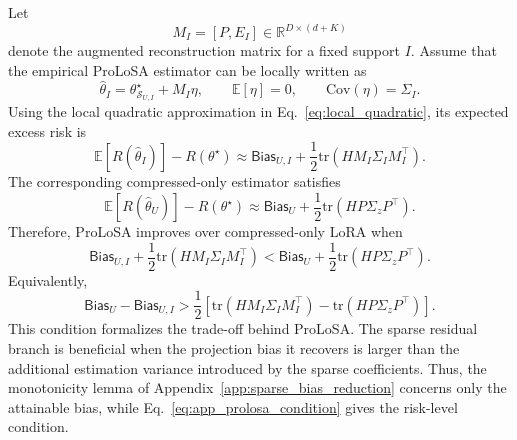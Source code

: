 Let
\begin{equation}
M_I=[P,E_I]\in\mathbb{R}^{D\times(d+K)}
\label{eq:app_augmented_reconstruction_matrix}
\end{equation}
denote the augmented reconstruction matrix for a fixed support $I$.
Assume that the empirical ProLoSA estimator can be locally written as
\begin{equation}
\hat{\theta}_I
=
\theta^\star_{\mathcal{S}_{U,I}}
+
M_I\eta,
\qquad
\mathbb{E}[\eta]=0,
\qquad
\mathrm{Cov}(\eta)=\Sigma_I .
\label{eq:app_prolosa_estimator_decomposition}
\end{equation}
Using the local quadratic approximation in Eq.~\eqref{eq:local_quadratic}, its expected excess risk is
\begin{equation}
\mathbb{E}[R(\hat{\theta}_I)]-R(\theta^\star)
\approx
\mathsf{Bias}_{U,I}
+
\frac{1}{2}
\mathrm{tr}(HM_I\Sigma_IM_I^\top).
\label{eq:app_prolosa_excess_risk}
\end{equation}
The corresponding compressed-only estimator satisfies
\begin{equation}
\mathbb{E}[R(\hat{\theta}_U)]-R(\theta^\star)
\approx
\mathsf{Bias}_{U}
+
\frac{1}{2}
\mathrm{tr}(HP\Sigma_zP^\top).
\label{eq:app_compressed_excess_risk}
\end{equation}
Therefore, ProLoSA improves over compressed-only LoRA when
\begin{equation}
\mathsf{Bias}_{U,I}
+
\frac{1}{2}
\mathrm{tr}(HM_I\Sigma_IM_I^\top)
<
\mathsf{Bias}_{U}
+
\frac{1}{2}
\mathrm{tr}(HP\Sigma_zP^\top).
\label{eq:app_prolosa_improvement_condition}
\end{equation}
Equivalently,
\begin{equation}
\mathsf{Bias}_{U}
-
\mathsf{Bias}_{U,I}
>
\frac{1}{2}
\left[
\mathrm{tr}(HM_I\Sigma_IM_I^\top)
-
\mathrm{tr}(HP\Sigma_zP^\top)
\right].
\label{eq:app_prolosa_condition}
\end{equation}
This condition formalizes the trade-off behind ProLoSA.
The sparse residual branch is beneficial when the projection bias it recovers is larger than the additional estimation variance introduced by the sparse coefficients.
Thus, the monotonicity lemma of Appendix~\ref{app:sparse_bias_reduction} concerns only the attainable bias, while Eq.~\eqref{eq:app_prolosa_condition} gives the risk-level condition.
